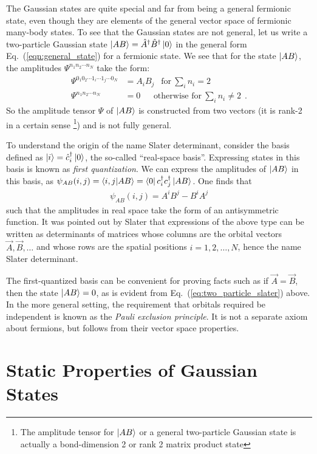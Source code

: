 \documentclass[aps, superscriptaddress, floatfix, onecolumn]{revtex4-2}
\begin{document}
The Gaussian states are quite special and far from being a general fermionic state, even though they are elements of the general vector space of fermionic many-body states. To see that the Gaussian states are not general, let us write a two-particle Gaussian state 
$\ket{AB} = \hat{A}^\dagger \hat{B}^\dagger \ket{0}$ in the general form Eq.~(\ref{eqn:general_state}) for a fermionic state.
We see that for the state $\ket{AB}$, the amplitudes $\Psi^{n_1 n_2 \cdots n_N}$ take the form:
\begin{align}
\Psi^{0_1 0_2 \cdots 1_i \cdots 1_j \cdots 0_N} & = A_i B_j \ \  \text{ for}\ \sum_i n_i = 2\\
\Psi^{n_1 n_2 \cdots n_N} & = 0 \ \ \ \ \  \ \ \text{otherwise for}\ \sum_i n_i \neq 2 \ \ .
\end{align}
So the amplitude tensor $\Psi$ of $\ket{AB}$ is constructed from two vectors (it is rank-2 in a certain sense \footnote{The amplitude tensor for $\ket{AB}$ or a general two-particle Gaussian state is actually a bond-dimension 2 or rank 2 matrix product state}) and is not fully general.

To understand the origin of the name Slater determinant, consider the basis defined as $\ket{i} = \hat{c}^\dagger_i \ket{0}$, the so-called ``real-space basis''.
Expressing states in this basis is known as \emph{first quantization}.
We can express the amplitudes of $\ket{AB}$ in this basis, as $\psi_{AB}(i,j) = \braket{i,j|AB} = \bra{0} c^\dagger_i c^\dagger_j \ket{AB}$. One finds that
\begin{align}
\psi_{AB}(i,j) =  A^i B^j - B^i A^j  \label{eq:two_particle_slater}
\end{align}
such that the amplitudes in real space take the form of an antisymmetric function.
It was pointed out by Slater that expressions of the above type can be written as determinants of matrices whose columns are the orbital vectors $\vec{A}, \vec{B}, \ldots$ and whose rows are the spatial positions $i=1,2, \ldots, N$, hence the name Slater determinant. 

The first-quantized basis can be convenient for proving facts such as if $\vec{A} = \vec{B}$, then the state $\ket{AB} = 0$, as is evident from Eq.~(\ref{eq:two_particle_slater}) above. In the more general setting, the requirement that orbitals required be independent is known as the \emph{Pauli exclusion principle}. It is not a separate axiom about fermions, but follows from their vector space properties.


\section{Static Properties of Gaussian States}
\end{document}

